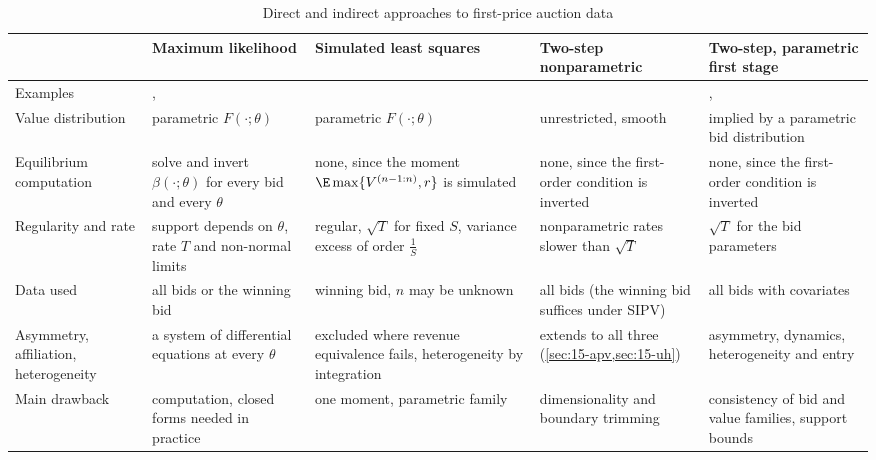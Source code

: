 \begin{table}[htbp]
\centering
\caption{Direct and indirect approaches to first-price auction data}\label{tab:15-direct-indirect}
\footnotesize
\begin{tabularx}{\textwidth}{@{}>{\raggedright\arraybackslash}p{2.0cm}>{\raggedright\arraybackslash}X>{\raggedright\arraybackslash}X>{\raggedright\arraybackslash}X>{\raggedright\arraybackslash}X@{}}
\toprule
 & Maximum likelihood & Simulated least squares & Two-step nonparametric & Two-step, parametric first stage \\
\midrule
Examples & \citet{Paarsch1992}, \citet{DonaldPaarsch1996} & \citet{LaffontOssardVuong1995} &
\citet{GuerrePerrigneVuong2000} & \citet{JofreBonetPesendorfer2003}, \citet{AtheyLevinSeira2011} \\
\addlinespace
Value distribution & parametric $F(\cdot;\theta)$ & parametric $F(\cdot;\theta)$ & unrestricted, smooth & implied by a
parametric bid distribution \\
\addlinespace
Equilibrium computation & solve and invert $\beta(\cdot;\theta)$ for every bid and every $\theta$ & none, since the
moment $\E\max\{V^{(n-1:n)},r\}$ is simulated & none, since the first-order condition is inverted & none, since the
first-order condition is inverted \\
\addlinespace
Regularity and rate & support depends on $\theta$, rate $T$ and non-normal limits & regular, $\sqrt T$ for fixed $S$,
variance excess of order $\frac1S$ & nonparametric rates slower than $\sqrt T$ & $\sqrt T$ for the bid parameters \\
\addlinespace
Data used & all bids or the winning bid & winning bid, $n$ may be unknown & all bids (the winning bid suffices under
SIPV) & all bids with covariates \\
\addlinespace
Asymmetry, affiliation, heterogeneity & a system of differential equations at every $\theta$ & excluded where revenue
equivalence fails, heterogeneity by integration & extends to all three (\cref{sec:15-apv,sec:15-uh}) & asymmetry,
dynamics, heterogeneity and entry \\
\addlinespace
Main drawback & computation, closed forms needed in practice & one moment, parametric family & dimensionality and
boundary trimming & consistency of bid and value families, support bounds \\
\bottomrule
\end{tabularx}
\end{table}
